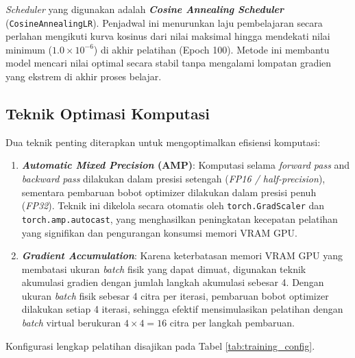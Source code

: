 \documentclass[12pt,a4paper,oneside]{book}
\begin{document}
\textit{Scheduler} yang digunakan adalah \textbf{\textit{Cosine Annealing Scheduler}} (\texttt{CosineAnnealingLR}). Penjadwal ini menurunkan laju pembelajaran secara perlahan mengikuti kurva kosinus dari nilai maksimal hingga mendekati nilai minimum ($1.0 \times 10^{-6}$) di akhir pelatihan (Epoch 100). Metode ini membantu model mencari nilai optimal secara stabil tanpa mengalami lompatan gradien yang ekstrem di akhir proses belajar.

\subsection{Teknik Optimasi Komputasi}

Dua teknik penting diterapkan untuk mengoptimalkan efisiensi komputasi:

\begin{enumerate}
  \item \textbf{\textit{Automatic Mixed Precision} (AMP)}: Komputasi selama \textit{forward pass} and \textit{backward pass} dilakukan dalam presisi setengah (\textit{FP16 / half-precision}), sementara pembaruan bobot optimizer dilakukan dalam presisi penuh (\textit{FP32}). Teknik ini dikelola secara otomatis oleh \texttt{torch.GradScaler} dan \texttt{torch.amp.autocast}, yang menghasilkan peningkatan kecepatan pelatihan yang signifikan dan pengurangan konsumsi memori VRAM GPU.
  \item \textbf{\textit{Gradient Accumulation}}: Karena keterbatasan memori VRAM GPU yang membatasi ukuran \textit{batch} fisik yang dapat dimuat, digunakan teknik akumulasi gradien dengan jumlah langkah akumulasi sebesar 4. Dengan ukuran \textit{batch} fisik sebesar 4 citra per iterasi, pembaruan bobot optimizer dilakukan setiap 4 iterasi, sehingga efektif mensimulasikan pelatihan dengan \textit{batch} virtual berukuran $4 \times 4 = 16$ citra per langkah pembaruan.
\end{enumerate}

Konfigurasi lengkap pelatihan disajikan pada Tabel \ref{tab:training_config}.
\end{document}
